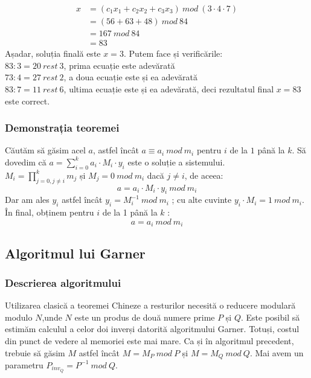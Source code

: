 \documentclass[12pt, oneside]{book}
\begin{document}
\begin{align*}
x &= (c_1x_1 + c_2x_2 + c_3x_3) \ mod \ (3 \cdot 4 \cdot 7) \\
&= (56+63+48) \ mod \ 84 \\
&= 167 \ mod \ 84 \\
&= 83
\end{align*}
Așadar, soluția finală este $x=3$. Putem face și verificările: \\
$ 83 : 3 = 20 \ rest \ 3$, prima ecuație este adevărată \\
$ 73 : 4 = 27 \ rest \ 2$, a doua ecuație este și ea adevărată \\
$ 83 : 7 = 11 \ rest \ 6$, ultima ecuație este și ea adevărată, deci rezultatul final $x=83$ este correct.




	 \subsubsection{Demonstrația teoremei}
	 Căutăm să găsim acel $a$, astfel încât $ a \equiv a_i \ mod \ m_i $ pentru $i$ de la $1$ până la $k$. Să dovedim că $ a = \sum_{i=0}^{k} a_i \cdot   M_i \cdot   y_i $ este o soluție a sistemului. \\
	 $M_i= \prod_{j=0,j \neq i}^{k} m_j $ și $M_j=0 \ mod \ m_i $ dacă $j \neq i$, de aceea: 
	 $$ a = a_i \cdot   M_i \cdot   y_i \ mod \ m_i $$
	 Dar am ales $y_i$ astfel încât $y_i = M_{i}^{-1} \ mod \ m_i$ ; cu alte cuvinte $y_i \cdot   M_i = 1 \ mod \ m_i$. În final, obținem pentru $i$ de la 1 până la $k$ :
	 $$ a = a_i \  mod \ m_i$$
	 
	 \subsection{Algoritmul lui Garner}
	  \subsubsection{Descrierea algoritmului}
	  Utilizarea clasică a teoremei Chineze a resturilor necesită o reducere modulară modulo $N$,unde $N$ este un produs de două numere prime $P$ și $Q$. Este posibil să estimăm calculul a celor doi inverși datorită algoritmului Garner. Totuși, costul din punct de vedere al memoriei este mai mare. Ca și în algoritmul precedent, trebuie să găsim $M$ astfel încât $ M = M_P \ mod \ P$ și $M = M_Q \ mod \ Q$. Mai avem un parametru $ P_{inv_Q} = P^{-1} \ mod \ Q$.
	  
\end{document}
